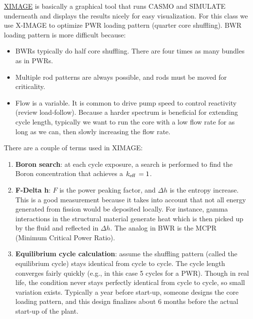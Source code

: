 \documentclass{school-22.211-notes}
\begin{document}
\clearpage


\href{http://www.studsvik.com/Business-Areas/Operating-Efficiency/Nuclear-Fuel-Analysis-Software/Loading-Pattern-Design/XIMAGE/}{XIMAGE}
is basically a graphical tool that runs CASMO and SIMULATE underneath
and displays the results nicely for easy visualization. For this class
we use X-IMAGE to optimize PWR loading pattern (quarter core
shuffling). BWR loading pattern is more difficult because:

\begin{itemize}

\item BWRs typically do half core shuffling. There are four times as
  many bundles as in PWRs.

\item Multiple rod patterns are always possible, and rods must be
  moved for criticality.

\item Flow is a variable. It is common to drive pump speed to control
  reactivity (review load-follow). Because a harder spectrum is
  beneficial for extending cycle length, typically we want to run the
  core with a low flow rate for as long as we can, then slowly
  increasing the flow rate.
\end{itemize}


There are a couple of terms used in XIMAGE: 

\begin{enumerate}

\item \textbf{Boron search}: at each cycle exposure, a search is
  performed to find the Boron concentration that achieves a $\left. k_{\mathrm{eff}} \right. =
  1$.

\item \textbf{F-Delta h}: $F$ is the power peaking factor, and $\Delta h$ is
  the entropy increase. This is a good measurement because it takes
  into account that not all energy generated from fission would be
  deposited locally. For instance, gamma interactions in the
  structural material generate heat which is then picked up by the
  fluid and reflected in $\Delta h$. The analog in BWR is the MCPR
  (Minimum Critical Power Ratio).

\item \textbf{Equilibrium cycle calculation}: assume the shuffling
  pattern (called the equilibrium cycle) stays identical from cycle to
  cycle. The cycle length converges fairly quickly (e.g., in this case
  5 cycles for a PWR). Though in real life, the condition never stays
  perfectly identical from cycle to cycle, so small variation
  exists. Typically a year before start-up, someone designs the core
  loading pattern, and this design finalizes about 6 months before the
  actual start-up of the plant.
\end{enumerate}
\end{document}
